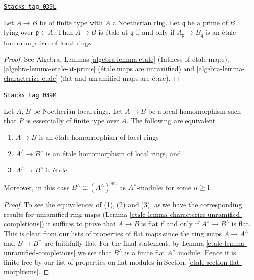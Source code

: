 \begin{lemma}
\label{etale-lemma-characterize-etale-Noetherian}
\href{https://stacks.math.columbia.edu/tag/039L}{\texttt{Stacks tag 039L}}

Let $A \to B$ be of finite type with $A$ a Noetherian ring.
Let $\mathfrak q$ be a prime of $B$ lying over $\mathfrak p \subset A$.
Then $A \to B$ is \'etale at $\mathfrak q$ if and only if
$A_{\mathfrak p} \to B_{\mathfrak q}$ is an \'etale homomorphism
of local rings.
\end{lemma}

\begin{proof}
See Algebra, Lemmas \ref{algebra-lemma-etale} (flatness of \'etale maps),
\ref{algebra-lemma-etale-at-prime} (\'etale maps are unramified)
and \ref{algebra-lemma-characterize-etale} (flat and unramified maps
are \'etale).
\end{proof}

\begin{lemma}
\label{etale-lemma-characterize-etale-completions}
\href{https://stacks.math.columbia.edu/tag/039M}{\texttt{Stacks tag 039M}}

Let $A$, $B$ be Noetherian local rings.
Let $A \to B$ be a local homomorphism such that $B$ is essentially of
finite type over $A$.
The following are equivalent
\begin{enumerate}
\item $A \to B$ is an \'etale homomorphism of local rings
\item $A^\wedge \to B^\wedge$ is an \'etale homomorphism of local rings, and
\item $A^\wedge \to B^\wedge$ is \'etale.
\end{enumerate}
Moreover, in this case $B^\wedge \cong (A^\wedge)^{\oplus n}$ as
$A^\wedge$-modules for some $n \geq 1$.
\end{lemma}

\begin{proof}

To see the equivalences of (1), (2) and (3), as we have the corresponding
results for unramified ring maps
(Lemma \ref{etale-lemma-characterize-unramified-completions})
it suffices to prove that
$A \to B$ is flat if and only if $A^\wedge \to B^\wedge$ is flat.
This is clear from our lists of properties of flat maps since
the ring maps $A \to A^\wedge$ and $B \to B^\wedge$ are faithfully flat.
For the final statement, by Lemma \ref{etale-lemma-unramified-completions}
we see that $B^\wedge$ is a finite flat $A^\wedge$ module.
Hence it is finite free by our list
of properties on flat modules in Section \ref{etale-section-flat-morphisms}.
\end{proof}

